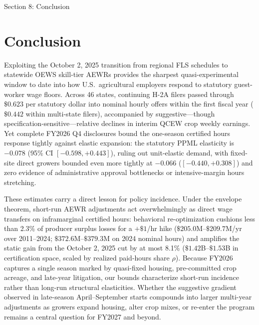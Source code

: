 \FloatBarrier
\begin{llmdraft}{Section 8: Conclusion}
\section{Conclusion}
\label{sec:conclusion}

Exploiting the October 2, 2025 transition from regional FLS schedules to
statewide OEWS skill-tier AEWRs provides the sharpest quasi-experimental window
to date into how U.S.\ agricultural employers respond to statutory guest-worker
wage floors. Across 46 states, continuing H-2A filers passed through $\$0.623$
per statutory dollar into nominal hourly offers within the first fiscal year
($\$0.442$ within multi-state filers), accompanied by suggestive---though
specification-sensitive---relative declines in interim QCEW crop weekly
earnings. Yet complete FY2026 Q4 disclosures bound the one-season certified
hours response tightly against elastic expansion: the statutory PPML elasticity
is $-0.078$ (95\% CI $[-0.598, +0.443]$), ruling out unit-elastic demand, with
fixed-site direct growers bounded even more tightly at $-0.066$ ($[-0.440,
+0.308]$) and zero evidence of administrative approval bottlenecks or
intensive-margin hours stretching.

These estimates carry a direct lesson for policy incidence. Under the envelope
theorem, short-run AEWR adjustments act overwhelmingly as direct wage transfers
on inframarginal certified hours: behavioral re-optimization cushions less than
2.3\% of producer surplus losses for a $+\$1$/hr hike ($\$205.0$M--$\$209.7$M/yr
over 2011--2024; $\$372.6$M--$\$379.3$M on 2024 nominal hours) and amplifies
the static gain from the October 2, 2025 cut by at most 8.1\%
($\$1.42$B--$\$1.53$B in certification space, scaled by realized paid-hours
share $\rho$). Because FY2026 captures a single season marked by quasi-fixed
housing, pre-committed crop acreage, and late-year litigation, our bounds
characterize short-run incidence rather than long-run structural elasticities.
Whether the suggestive gradient observed in late-season April--September starts
compounds into larger multi-year adjustments as growers expand housing, alter
crop mixes, or re-enter the program remains a central question for FY2027 and
beyond.
\end{llmdraft}




